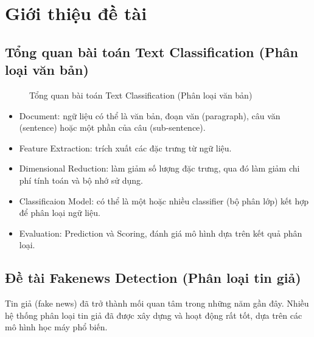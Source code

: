 \documentclass[12pt]{article}
\begin{document}
\begin{titlepage}
\vfill
\end{titlepage}
	
	
\tableofcontents
\pagebreak

\section{Giới thiệu đề tài}
\subsection{Tổng quan bài toán Text Classification (Phân loại văn bản)}
\begin{figure}[H]
	\centering
	\caption{Tổng quan bài toán Text Classification (Phân loại văn bản)\cite{Kowsari_2019}}
\end{figure}
\begin{itemize}
\item Document: ngữ liệu có thể là văn bản, đoạn văn (paragraph), câu văn (sentence) hoặc một phần của câu (sub-sentence).
\item Feature Extraction: trích xuất các đặc trưng từ ngữ liệu.
\item Dimensional Reduction: làm giảm số lượng đặc trưng, qua đó làm giảm chi phí tính toán và bộ nhớ sử dụng.
\item Classificaion Model: có thể là một hoặc nhiều classifier (bộ phân lớp) kết hợp để phân loại ngữ liệu.
\item Evaluation: Prediction và Scoring, đánh giá mô hình dựa trên kết quả phân loại.
\end{itemize}

\subsection{Đề tài Fakenews Detection (Phân loại tin giả)}
Tin giả (fake news) đã trở thành mối quan tâm trong những năm gần đây. Nhiều hệ thống phân loại tin giả đã được xây dựng và hoạt động rất tốt, dựa trên các mô hình học máy phổ biến.
\end{document}
